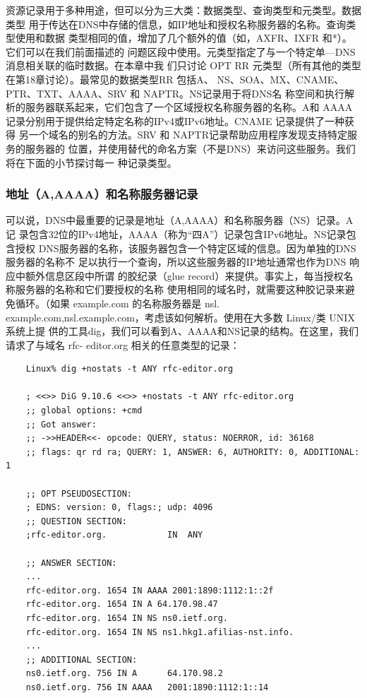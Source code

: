 资源记录用于多种用途，但可以分为三大类：数据类型、查询类型和元类型。数据类型
用于传达在DNS中存储的信息，如IP地址和授权名称服务器的名称。查询类型使用和数据
类型相同的值，增加了几个额外的值（如，AXFR、IXFR 和*）。它们可以在我们前面描述的
问题区段中使用。元类型指定了与一个特定单—DNS 消息相关联的临时数据。在本章中我
们只讨论 OPT RR 元类型（所有其他的类型在第18章讨论）。最常见的数据类型RR 包括A、
NS、SOA、MX、CNAME、PTR、TXT、AAAA、SRV 和 NAPTR。NS记录用于将DNS名
称空间和执行解析的服务器联系起来，它们包含了一个区域授权名称服务器的名称。A和
AAAA记录分别用于提供给定特定名称的IPv4或IPv6地址。CNAME 记录提供了一种获得
另一个域名的别名的方法。SRV 和 NAPTR记录帮助应用程序发现支持特定服务的服务器的
位置，并使用替代的命名方案（不是DNS）来访问这些服务。我们将在下面的小节探讨每一
种记录类型。

\subsubsection{地址（A,AAAA）和名称服务器记录}

可以说，DNS中最重要的记录是地址（A,AAAA）和名称服务器（NS）记录。A记
录包含32位的IPv4地址，AAAA（称为“四A”）记录包含IPv6地址。NS记录包含授权
DNS服务器的名称，该服务器包含一个特定区域的信息。因为单独的DNS服务器的名称不
足以执行一个查询，所以这些服务器的IP地址通常也作为DNS 响应中额外信息区段中所谓
的胶纪录（glue record）来提供。事实上，每当授权名称服务器的名称和它们要授权的名称
使用相同的域名时，就需要这种胶记录来避免循环。（如果 example.com 的名称服务器是 nsl.
example.com,nsl.example.com，考虑该如何解析。使用在大多数 Linux/类 UNIX 系统上提
供的工具dig，我们可以看到A、AAAA和NS记录的结构。在这里，我们请求了与域名 rfc-
editor.org 相关的任意类型的记录：

\begin{verbatim}
    Linux% dig +nostats -t ANY rfc-editor.org
    
    ; <<>> DiG 9.10.6 <<>> +nostats -t ANY rfc-editor.org
    ;; global options: +cmd
    ;; Got answer:
    ;; ->>HEADER<<- opcode: QUERY, status: NOERROR, id: 36168
    ;; flags: qr rd ra; QUERY: 1, ANSWER: 6, AUTHORITY: 0, ADDITIONAL: 1
    
    ;; OPT PSEUDOSECTION:
    ; EDNS: version: 0, flags:; udp: 4096
    ;; QUESTION SECTION:
    ;rfc-editor.org.			IN	ANY

    ;; ANSWER SECTION:
    ...
    rfc-editor.org. 1654 IN AAAA 2001:1890:1112:1::2f
    rfc-editor.org. 1654 IN A 64.170.98.47
    rfc-editor.org. 1654 IN NS ns0.ietf.org.
    rfc-editor.org. 1654 IN NS ns1.hkg1.afilias-nst.info.
    ...
    ;; ADDITIONAL SECTION:
    ns0.ietf.org. 756 IN A      64.170.98.2
    ns0.ietf.org. 756 IN AAAA   2001:1890:1112:1::14
\end{verbatim}


